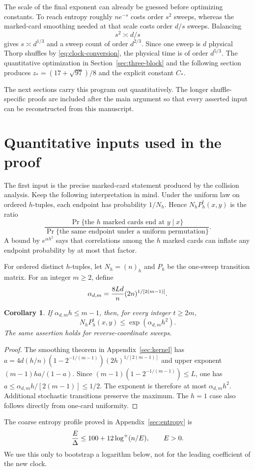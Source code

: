 \documentclass[11pt]{article}
\numberwithin{equation}{section}
\newtheorem{corollary}[theorem]{Corollary}
\theoremstyle{definition}\newtheorem{definition}[theorem]{Definition}
\theoremstyle{remark}\newtheorem{remark}[theorem]{Remark}
\begin{document}
The scale of the final exponent can already be guessed before optimizing
constants.  To reach entropy roughly $ne^{-s}$ costs order $s^2$ sweeps,
whereas the marked-card smoothing needed at that scale costs order $d/s$
sweeps.  Balancing
\[
 s^2\asymp d/s
\]
gives $s\asymp d^{1/3}$ and a sweep count of order $d^{2/3}$.  Since one sweep
is $d$ physical Thorp shuffles by \eqref{eq:clock-conversion}, the physical
time is of order $d^{5/3}$.  The quantitative optimization in
Section~\ref{sec:three-block} and the following section produces
$z_*=(17+\sqrt{97})/8$ and the explicit constant $C_*$.

The next sections carry this program out quantitatively.  The longer
shuffle-specific proofs are included after the main argument so that every
asserted input can be reconstructed from this manuscript.

\section{Quantitative inputs used in the proof}
The first input is the precise marked-card statement produced by the collision
analysis.  Keep the following interpretation in mind.  Under the uniform law
on ordered $h$-tuples, each endpoint has probability $1/N_h$.  Hence
$N_hP_h^t(x,y)$ is the ratio
\[
 \frac{\Pr\{\text{the $h$ marked cards end at }y\mid x\}}
      {\Pr\{\text{the same endpoint under a uniform permutation}\}}.
\]
A bound by $e^{\alpha h^2}$ says that correlations among the $h$ marked cards
can inflate any endpoint probability by at most that factor.

For ordered distinct $h$-tuples, let $N_h=(n)_h$ and $P_h$ be the
one-sweep transition matrix. For an integer $m\ge2$, define
\begin{equation}\label{eq:alpha}
 \alpha_{d,m}={8Ld\over n}(2n)^{1/[2(m-1)]}.
\end{equation}
\begin{corollary}\label{cor:quadratic}
If $\alpha_{d,m}h\le m-1$, then, for every integer $t\ge2m$,
\begin{equation}\label{eq:quadratic-budget}
 N_hP_h^t(x,y)\le \exp(\alpha_{d,m}h^2).
\end{equation}
The same assertion holds for reverse-coordinate sweeps.
\end{corollary}
\begin{proof}
The smoothing theorem in Appendix~\ref{sec:kernel} has
$a=4d(h/n)(1-2^{-1/(m-1)})(2h)^{1/[2(m-1)]}$ and upper exponent
$(m-1)ha/(1-a)$. Since
$(m-1)(1-2^{-1/(m-1)})\le L$, one has
$a\le\alpha_{d,m}h/[2(m-1)]\le1/2$. The exponent is therefore at most
$\alpha_{d,m}h^2$. Additional stochastic transitions preserve the maximum.
The $h=1$ case also follows directly from one-card uniformity.
\end{proof}
The coarse entropy profile proved in Appendix~\ref{sec:entropy} is
\begin{equation}\label{eq:coarse-profile}
 {E\over\Delta}\le100+12\log^+(n/E),\qquad E>0.
\end{equation}
We use this only to bootstrap a logarithm below, not for the leading
coefficient of the new clock.
\end{document}
